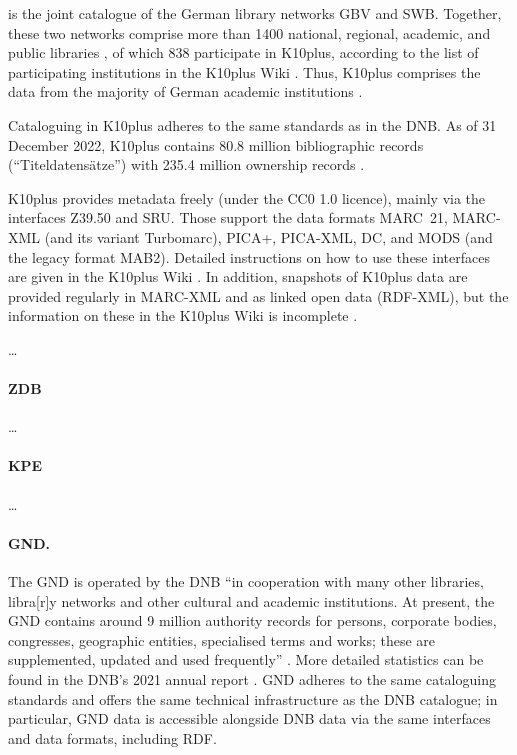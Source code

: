 is the joint catalogue of the German library networks GBV and SWB.
Together, these two networks comprise more than 1400 national, regional,
academic, and public libraries \autocite{BSZGBV,GBV_VZG},
of which 838 participate in \gls{K10plus}, according to the list of participating institutions
in the K10plus Wiki \autocite{K10plusWiki}. Thus, \gls{K10plus} comprises the data from
the majority of German academic institutions \autocite[cf.][]{BSZ_K10plus}.

Cataloguing in K10plus adheres to the same standards as in the DNB.
As of 31 December 2022, K10plus contains 80.8 million bibliographic records (\enquote{Titeldatensätze})
with 235.4 million ownership records \autocite{GBV_K10plus_Statistik}.

K10plus provides metadata freely (under the CC0 1.0 licence),
mainly via the interfaces Z39.50 and SRU.
Those support the data formats MARC~21, MARC-XML (and its variant Turbomarc),
PICA+, PICA-XML, DC, and MODS (and the legacy format MAB2).
Detailed instructions on how to use these interfaces
are given in the K10plus Wiki \autocite{K10plusWiki}.
In addition, snapshots of K10plus data are provided regularly
in MARC-XML and as linked open data (RDF-XML), but the information
on these in the K10plus Wiki is incomplete \autocite{K10plusWikiOD}.



\dots




\paragraph{ZDB}

\dots

\paragraph{KPE}

\dots

\paragraph{GND.}

The \gls{GND} is operated by the \gls{DNB}
\enquote{in cooperation with many other libraries, libra[r]y networks and other cultural and academic institutions.
At present, the GND contains around 9 million authority records for persons, corporate bodies, congresses, geographic entities, specialised terms and works; these are supplemented, updated and used frequently} \autocite{DNB_cataloguing}. More detailed statistics can be found in the DNB's
2021 annual report \autocite[p.49]{DNB_Jahresbericht_2021}.
GND adheres to the same cataloguing standards and offers the same technical infrastructure
as the DNB catalogue; in particular, GND data is accessible alongside DNB data
via the same interfaces and data formats, including RDF.

